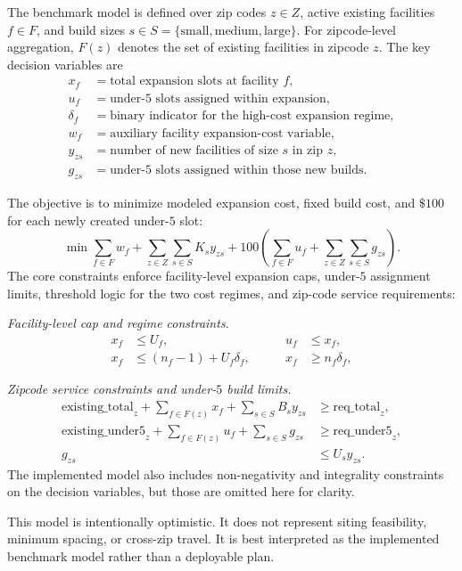 \documentclass[11pt]{article}
\begin{document}
The benchmark model is defined over zip codes \(z \in Z\), active existing facilities \(f \in F\), and build sizes \(s \in S=\{\text{small},\text{medium},\text{large}\}\). For zipcode-level aggregation, \(F(z)\) denotes the set of existing facilities in zipcode \(z\). The key decision variables are
\[
\begin{aligned}
x_f &= \text{total expansion slots at facility } f,\\
u_f &= \text{under-\(5\) slots assigned within expansion},\\
\delta_f &= \text{binary indicator for the high-cost expansion regime},\\
w_f &= \text{auxiliary facility expansion-cost variable},\\
y_{zs} &= \text{number of new facilities of size } s \text{ in zip } z,\\
g_{zs} &= \text{under-\(5\) slots assigned within those new builds}.
\end{aligned}
\]

The objective is to minimize modeled expansion cost, fixed build cost, and \(\$100\) for each newly created under-\(5\) slot:
\[
\min \sum_{f \in F} w_f
 + \sum_{z \in Z}\sum_{s \in S} K_s y_{zs}
 + 100\left(\sum_{f \in F}u_f+\sum_{z \in Z}\sum_{s \in S}g_{zs}\right).
\]
The core constraints enforce facility-level expansion caps, under-\(5\) assignment limits, threshold logic for the two cost regimes, and zip-code service requirements:

\noindent\textit{Facility-level cap and regime constraints.}
\[
\begin{alignedat}{2}
x_f &\le U_f, &\qquad u_f &\le x_f,\\
x_f &\le (n_f-1)+U_f\delta_f, &\qquad x_f &\ge n_f\delta_f,
\end{alignedat}
\]

\noindent\textit{Zipcode service constraints and under-\(5\) build limits.}
\[
\begin{aligned}
\mathrm{existing\_total}_z + \sum_{f \in F(z)}x_f + \sum_{s \in S}B_s y_{zs}
&\ge \mathrm{req\_total}_z,\\
\mathrm{existing\_under5}_z + \sum_{f \in F(z)}u_f + \sum_{s \in S}g_{zs}
&\ge \mathrm{req\_under5}_z,\\
g_{zs} &\le U_s y_{zs}.
\end{aligned}
\] The implemented model also includes non-negativity and integrality constraints on the decision variables, but those are omitted here for clarity.

This model is intentionally optimistic. It does not represent siting feasibility, minimum spacing, or cross-zip travel. It is best interpreted as the implemented benchmark model rather than a deployable plan.
\end{document}
